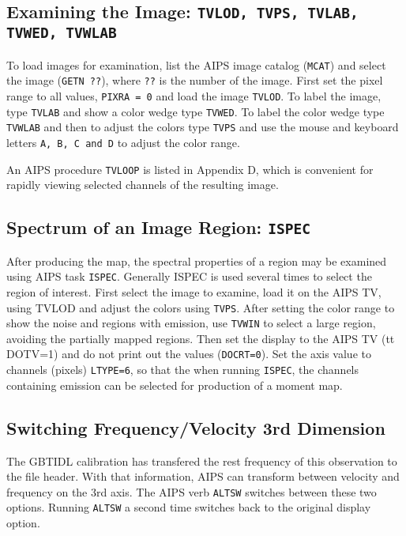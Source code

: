 \documentclass[12pt,twoside]{article}
\begin{document}
\subsection{Examining the Image: {\tt TVLOD, TVPS, TVLAB, TVWED, TVWLAB}}
To load images for examination, list the AIPS image catalog ({\tt MCAT}) and
select the image ({\tt GETN ??}), where {\tt ??} is the number of the
image.     First set the pixel range to all values, {\tt PIXRA = 0} and load
the image {\tt TVLOD}.   To label the image, type {\tt TVLAB} and
show a color wedge type {\tt TVWED}.   To label the color wedge
type {\tt TVWLAB} and then to adjust the colors type {\tt TVPS}
and use the mouse and keyboard letters {\tt A, B, C and D} to 
adjust the color range.

An AIPS procedure {\tt TVLOOP} is listed in Appendix D, which is
convenient for rapidly viewing selected channels of the resulting image.

\subsection{Spectrum of an Image Region: {\tt ISPEC}}
After producing the map, the spectral properties of a region may be
examined using AIPS task {\tt ISPEC}.   Generally ISPEC is used several
times to select the region of interest.   First select the image to examine,
load it on the AIPS TV, using {TVLOD} and adjust the colors using
{\tt TVPS}.   After setting the color range to show the noise
and regions with emission,  use {\tt TVWIN}  to select a large region, 
avoiding the partially mapped regions.    Then set the display to 
the AIPS TV ({tt DOTV=1}) and do not print out the values ({\tt DOCRT=0}).
Set the axis value to channels (pixels) {\tt LTYPE=6}, so that
the when running {\tt ISPEC}, the channels containing emission can
be selected for production of a moment map.
\subsection{Switching Frequency/Velocity 3rd Dimension}
The GBTIDL calibration has transfered the rest frequency of this observation
to the file header.  With that information, AIPS can transform between velocity
and frequency on the 3rd axis.  The AIPS verb {\tt ALTSW} switches
between these two options.   Running {\tt ALTSW} a second time
switches back to the original display option.
\end{document}
